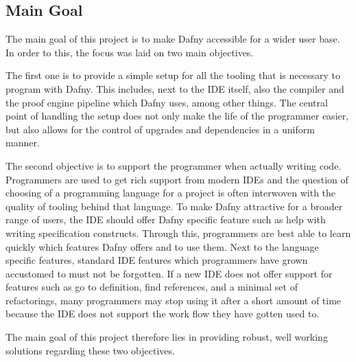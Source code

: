 \subsection{Main Goal}\label{mainGoal}

The main goal of this project is to make Dafny accessible for a wider user base. In order to this, the focus was laid on two main objectives. \newline

The first one is to provide a simple setup for all the tooling that is necessary to program with Dafny. This includes, next to the IDE itself, also the compiler and the proof engine pipeline which Dafny uses, among other things. The central point of handling the setup does not only make the life of the programmer easier, but also allows for the control of upgrades and dependencies in a uniform manner. \newline

The second objective is to support the programmer when actually writing code. Programmers are used to get rich support from modern IDEs and the question of choosing of a programming language for a project is often interwoven with the quality of tooling behind that language. To make Dafny attractive for a broader range of users, the IDE should offer Dafny specific feature such as help with writing specification constructs. Through this, programmers are best able to learn quickly which features Dafny offers and to use them. Next to the language specific features, standard IDE features which programmers have grown accustomed to must not be forgotten. If a new IDE does not offer support for features such as go to definition, find references, and a minimal set of refactorings, many programmers may stop using it after a short amount of time because the IDE does not support the work flow they have gotten used to. \newline

The main goal of this project therefore lies in providing robust, well working solutions regarding these two objectives. \newline